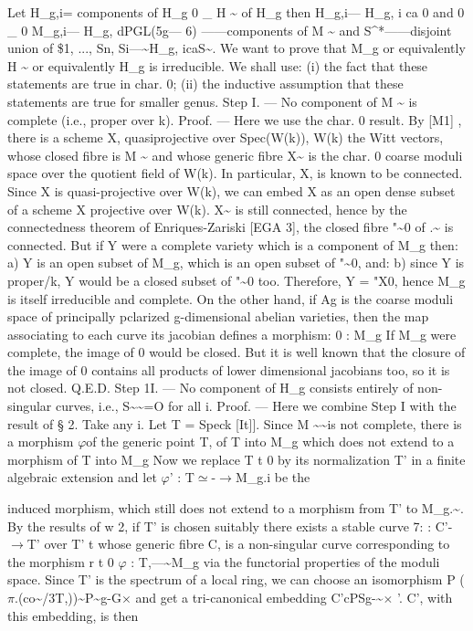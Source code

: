 \documentclass[11pt]{article}
\theoremstyle{plain}
\theoremstyle{definition}
\theoremstyle{remark}
\begin{document}
Let H\_g,i= components of H\_g 0 \_ H \textasciitilde{} of H\_g then H\_g,i--- H\_g, i ca 0 and 0 \_ 0 M\_g,i--- H\_g, dPGL(5g--- 6) ------components of M \textasciitilde{} and S\textasciicircum{}*------disjoint union of \$1, ..., Sn, Si---\textasciitilde{}H\_g, icaS\textasciitilde{}. We want to prove that M\_g or equivalently H \textasciitilde{} or equivalently H\_g is irreducible. We shall use: (i) the fact that these statements are true in char. 0; (ii) the inductive assumption that these statements are true for smaller genus. Step I. --- No component of M \textasciitilde{} is complete (i.e., proper over k). Proof. --- Here we use the char. 0 result. By [M1] , there is a scheme X, quasiprojective over Spec(W(k)), W(k) the Witt vectors, whose closed fibre is M \textasciitilde{} and whose generic fibre X\textasciitilde{} is the char. 0 coarse moduli space over the quotient field of W(k). In particular, X, is known to be connected. Since X is quasi-projective over W(k), we can embed X as an open dense subset of a scheme X projective over W(k). X\textasciitilde{} is still connected, hence by the connectedness theorem of Enriques-Zariski [EGA 3], the closed fibre "\textasciitilde{}0 of .\textasciitilde{} is connected. But if Y were a complete variety which is a component of M\_g then: a) Y is an open subset of M\_g, which is an open subset of "\textasciitilde{}0, and: b) since Y is proper/k, Y would be a closed subset of "\textasciitilde{}0 too. Therefore, Y = "X0, hence M\_g is itself irreducible and complete. On the other hand, if Ag is the coarse moduli space of principally pclarized g-dimensional abelian varieties, then the map associating to each curve its jacobian defines a morphism: 0 : M\_g If M\_g were complete, the image of 0 would be closed. But it is well known that the closure of the image of 0 contains all products of lower dimensional jacobians too, so it is not closed. Q.E.D. Step 1I. --- No component of H\_g consists entirely of non-singular curves, i.e., S\textasciitilde{}\textasciitilde{}=O for all i. Proof. --- Here we combine Step I with the result of § 2. Take any i. Let T = Speck [It]]. Since M \textasciitilde{}\textasciitilde{}is not complete, there is a morphism $\varphi$of the generic point T, of T into M\_g which does not extend to a morphism of T into M\_g Now we replace T t 0 by its normalization T' in a finite algebraic extension and let $\varphi$' : T$\simeq$-$\to$M\_g.i be the

induced morphism, which still does not extend to a morphism from T' to M\_g.\textasciitilde{}. By the results of w 2, if T' is chosen suitably there exists a stable curve 7: : C'-$\to$T' over T' t whose generic fibre C, is a non-singular curve corresponding to the morphism r t 0 $\varphi$ : T,---\textasciitilde{}M\_g via the functorial properties of the moduli space. Since T' is the spectrum of a local ring, we can choose an isomorphism P ($\pi$.(co\textasciitilde{}/3T,))\textasciitilde{}P\textasciitilde{}g-G$\times$ and get a tri-canonical embedding C'cPSg-\textasciitilde{}$\times$ '. C', with this embedding, is then
\end{document}
